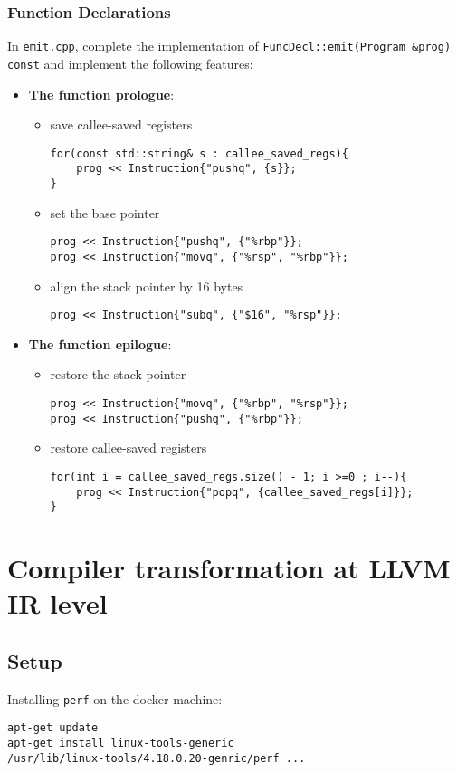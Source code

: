 \documentclass{report}
\begin{document}
	\subsection{Function Declarations}
	In \texttt{emit.cpp}, complete the implementation of \texttt{FuncDecl::emit(Program \&prog) const} and implement the following features:
	\begin{itemize}
		\item \textbf{The function prologue}:
		\begin{itemize}
			\item save callee-saved registers
			\begin{lstlisting}
for(const std::string& s : callee_saved_regs){
	prog << Instruction{"pushq", {s}};
}
			\end{lstlisting}
			\item set the base pointer
			\begin{lstlisting}
prog << Instruction{"pushq", {"%rbp"}};
prog << Instruction{"movq", {"%rsp", "%rbp"}};
			\end{lstlisting}
			\item align the stack pointer by 16 bytes
			\begin{lstlisting}
prog << Instruction{"subq", {"$16", "%rsp"}};
			\end{lstlisting}
		\end{itemize}
		\item \textbf{The function epilogue}:
		\begin{itemize}
			\item restore the stack pointer
			\begin{lstlisting}
prog << Instruction{"movq", {"%rbp", "%rsp"}};
prog << Instruction{"pushq", {"%rbp"}};
			\end{lstlisting}
			\item restore callee-saved registers
			\begin{lstlisting}
for(int i = callee_saved_regs.size() - 1; i >=0 ; i--){
	prog << Instruction{"popq", {callee_saved_regs[i]}};
}
			\end{lstlisting}
		\end{itemize}
	\end{itemize}
\chapter{Compiler transformation at LLVM IR level}	

\section{Setup}
Installing \texttt{perf} on the docker machine:
\begin{lstlisting}
apt-get update
apt-get install linux-tools-generic
/usr/lib/linux-tools/4.18.0.20-genric/perf ...
\end{lstlisting}
\end{document}
